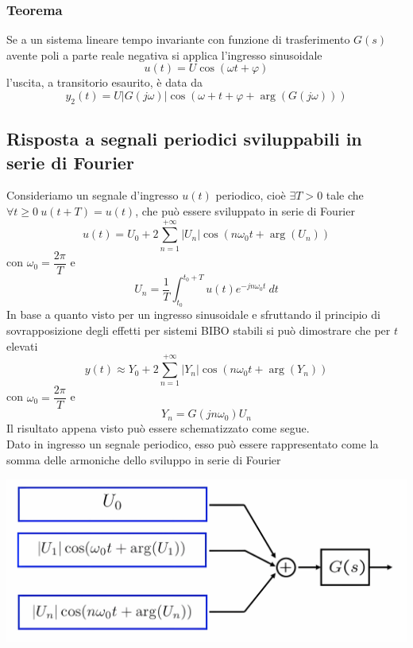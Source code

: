 \documentclass{article}
\numberwithin{equation}{subsection}
\let\oldsubsection\subsection%
\renewcommand{\subsection}{%
  \renewcommand{\theequation}{\thesubsection.\arabic{equation}}%
  \oldsubsection}%
\begin{document}
\subsubsection{Teorema}
Se a un sistema lineare tempo invariante con funzione di trasferimento $G(s)$ avente poli a parte reale negativa si applica l'ingresso sinusoidale
\[
    u(t) = U \cos(\omega t + \varphi)
\]
l'uscita, a transitorio esaurito, è data da
\begin{equation}
    y_2(t) = U |G(j\omega)| \cos(\omega +t + \varphi + \arg(G(j \omega)))
\end{equation}


\subsection{Risposta a segnali periodici sviluppabili in serie di Fourier}
Consideriamo un segnale d'ingresso $u(t)$ periodico, cioè $\exists T>0$ tale che $\forall t \geq 0 \ u(t+T) = u(t)$, che può essere sviluppato in serie di Fourier
\begin{equation}
    u(t) = U_0 + 2 \sum_{n=1}^{+ \infty} |U_n| \cos \left(n \omega_0 t + \arg(U_n)\right)
\end{equation}
con $\omega_0 = \dfrac{2 \pi}{T}$ e 
\[
    U_n = \frac{1}{T} \int_{t_0}^{t_0+T} u(t) e^{-j n \omega_0 t} \ dt  \tag*{$n=0,1,...$}
\]
In base a quanto visto per un ingresso sinusoidale e sfruttando il principio di sovrapposizione degli effetti per sistemi BIBO stabili si può dimostrare che per $t$ elevati
\begin{equation}
    y(t) \approx Y_0 + 2 \sum_{n=1}^{+ \infty} |Y_n| \cos(n \omega_0 t + \arg(Y_n))
\end{equation}
con $\omega_0 = \dfrac{2 \pi}{T}$ e 
\[
    Y_n = G(jn\omega_0)U_n  \tag*{$n=0,1,...$}
\]
Il risultato appena visto può essere schematizzato come segue.\\
Dato in ingresso un segnale periodico, esso può essere rappresentato come la somma delle armoniche dello sviluppo in serie di Fourier
\begin{center}
    \includegraphics[scale=0.12]{Images/Fourier_1.png}
\end{center}
\end{document}
